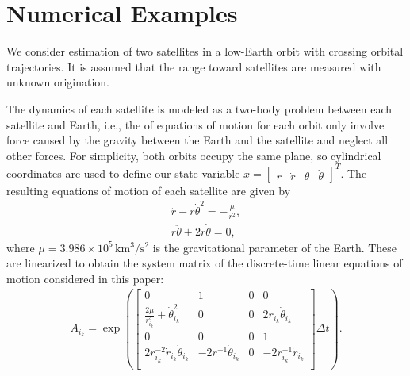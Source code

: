 \documentclass[letterpaper, 10pt, conference]{ieeeconf}
\begin{document}
\section{Numerical Examples}
\label{NumRes}




We consider estimation of two satellites in a low-Earth orbit with crossing orbital trajectories. It is assumed that the range toward satellites are measured with unknown origination. 

The dynamics of each satellite is modeled as a two-body problem between each satellite and Earth, i.e., the of equations of motion for each orbit only involve force caused by the gravity between the Earth and the satellite and neglect all other forces. For simplicity, both orbits occupy the same plane, so cylindrical coordinates are used to define our state variable $x=\begin{bmatrix} r & \dot r & \theta & \dot \theta\end{bmatrix}^{T}$. The resulting equations of motion of each satellite are given by
\begin{gather*}
\ddot r - r\dot\theta^2 = -\frac{\mu}{r^2},\\
r\ddot\theta + 2\dot r\dot\theta =0,
\end{gather*}
where $\mu=3.986\times10^5\, \mathrm{km^3/s^2}$ is the gravitational parameter of the Earth. These are linearized to obtain the system matrix of the discrete-time linear equations of motion considered in this paper:
\begin{align}
A_{i_k}=
\exp\left(\begin{bmatrix}
0 & 1 & 0 & 0 \\
\frac{2\mu}{r_{i_k}^3} +\dot\theta^2_{i_k} & 0 & 0 & 2r_{i_k}\dot \theta_{i_k} \\
0 & 0 & 0 & 1 \\
2r_{i_k}^{-2}\dot r_{i_k}\dot\theta_{i_k} & -2r^{-1}\dot\theta_{i_k} & 0 &  -2r_{i_k}^{-1}\dot r_{i_k}\\
\end{bmatrix}\Delta t\right).
\end{align}
\end{document}
